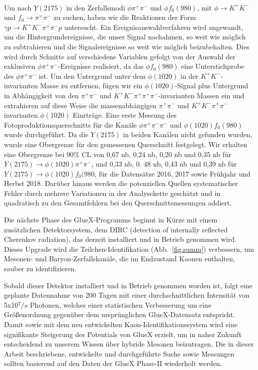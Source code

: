 ~\par Um nach $Y(2175)$ in den Zerfallsmodi $\phi \pi^+ \pi^-$ und $\phi f_0(980)$, mit $\phi \rightarrow K^+ K^- $ und $f_0 \rightarrow \pi^+ \pi^-$ zu suchen, haben wir die Reaktionen der Form $\gamma p \rightarrow K^+ K^- \pi^+ \pi^- p$ untersucht. Ein Ereignisauswahlverfahren wird angewandt, um die Hintergrundereignisse, die unser Signal nachahmen, so weit wie möglich zu subtrahieren und die Signalereignisse so weit wie möglich beizubehalten. Dies wird durch Schnitte auf verschiedene Variablen gefolgt von der Auswahl der exklusiven $\phi \pi^+ \pi^-$-Ereignisse realisiert, da das $\phi f_0(980)$ eine Unterstichprobe des $\phi \pi^+ \pi^-$ ist. Um den Untergrund unter dem $\phi(1020)$ in der $K^{+}K^{-}$-invarianten Masse zu entfernen, fügen wir ein $\phi(1020)$-Signal plus Untergrund in Abhängigkeit von den $\pi^{+}\pi^{-}$ und $K^+K^-\pi^{+}\pi^{+}\pi^{-}$-invarianten Massen ein und extrahieren auf diese Weise die massenabhängigen $\pi^{+}\pi^{-}$ und $K^+K^-\pi^{+}\pi^{-}$ invarianten $\phi(1020)$ Einrträge. Eine erste Messung des Fotoproduktionsquerschnitts für die Kanäle $\phi\pi^{+}\pi^{-}\pi^{-}$ und $\phi(1020) f_0(980)$ wurde durchgeführt. Da die $Y(2175)$ in beiden Kanälen nicht gefunden wurden, wurde eine Obergrenze für den gemessenen Querschnitt festgelegt. Wir erhalten eine Obergrenze bei $90\%$ CL von 0,67 nb, 0,24 nb, 0,20 nb und 0,35 nb für $Y(2175)\rightarrow \phi(1020) \pi^+\pi^-$, und 0,33 nb, 0. 48 nb, 0,43 nb und 0,39 nb für $Y(2175)\rightarrow \phi(1020) f_0(980$, für die Datensätze 2016, 2017 sowie Frühjahr und Herbst 2018. Darüber hinaus werden die potenziellen Quellen systematischer Fehler durch mehrere Variationen in der Analysekette geschätzt und in quadratisch zu den Gesamtfehlern bei den Querschnittsmessungen addiert.
~\par Die n\"achste Phase des GlueX-Programms beginnt in K\"urze mit einem zus\"atzlichen Detektorsystem, dem DIRC (detection of internally reflected Cherenkov radiation), das derzeit installiert und in Betrieb genommen wird. Dieses Upgrade wird die Teilchen-Identifikation (Abb.~\ref{fig.summ}) verbessern, um Mesonen- und Baryon-Zerfallskan\"ale, die im Endzustand Kaonen enthalten, sauber zu identifizieren.
~\par Sobald dieser Detektor installiert und in Betrieb genommen worden ist, folgt eine geplante Datennahme von 200 Tagen mit einer durchschnittlichen Intensit\"at von 5x10$^{7}/s$ Photonen, welches einer statistischen Verbesserung um eine Gr\"oßenordnung gegen\"uber dem urspr\"unglichen GlueX-Datensatz entspricht. Damit sowie mit dem neu entwickelten Kaon-Identifikationssystem wird eine signifikante Steigerung des Potentials von GlueX erzielt, um in naher Zukunft entscheidend zu unserem Wissen \"uber hybride Mesonen beizutragen. Die in dieser Arbeit beschriebene, entwickelte und durchgef\"uhrte Suche sowie Messungen sollten basierend auf den Daten der GlueX Phase-II wiederholt werden.

